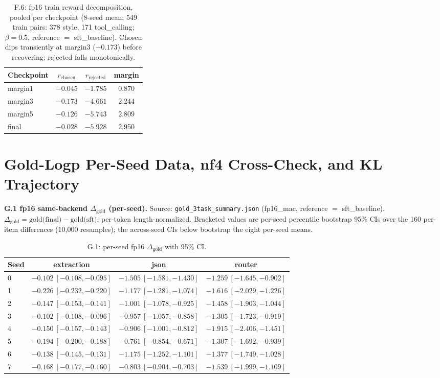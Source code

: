\begin{table}[H]
\centering
\small
\caption{F.6: fp16 train reward decomposition, pooled per checkpoint (8-seed mean; 549 train pairs: 378 style, 171 tool\_calling; $\beta{=}0.5$, reference $=$ sft\_baseline). Chosen dips transiently at margin3 ($-0.173$) before recovering; rejected falls monotonically.}
\label{tab:fp16-train-pooled}
\begin{tabular}{@{}lccc@{}}
\toprule
Checkpoint & $r_{\text{chosen}}$ & $r_{\text{rejected}}$ & margin\\
\midrule
margin1 & $-0.045$ & $-1.785$ & 0.870\\
margin3 & $-0.173$ & $-4.661$ & 2.244\\
margin5 & $-0.126$ & $-5.743$ & 2.809\\
final & $-0.028$ & $-5.928$ & 2.950\\
\bottomrule
\end{tabular}
\end{table}

\section{Gold-Logp Per-Seed Data, nf4 Cross-Check, and KL Trajectory}
\label{app:gold}
\textbf{G.1 fp16 same-backend $\Delta_{\text{gold}}$ (per-seed).} Source: \texttt{gold\_3task\_summary.json} (fp16\_mac, reference $=$ sft\_baseline). $\Delta_{\text{gold}} = \text{gold(final)} - \text{gold(sft)}$, per-token length-normalized. Bracketed values are per-seed percentile bootstrap 95\% CIs over the 160 per-item differences (10{,}000 resamples); the across-seed CIs below bootstrap the eight per-seed means.

\begin{table}[H]
\centering
\small
\caption{G.1: per-seed fp16 $\Delta_{\text{gold}}$ with 95\% CI.}
\begin{tabular}{@{}lccc@{}}
\toprule
Seed & extraction & json & router\\
\midrule
0 & $-0.102\ [-0.108,-0.095]$ & $-1.505\ [-1.581,-1.430]$ & $-1.259\ [-1.645,-0.902]$\\
1 & $-0.226\ [-0.232,-0.220]$ & $-1.177\ [-1.281,-1.074]$ & $-1.616\ [-2.029,-1.226]$\\
2 & $-0.147\ [-0.153,-0.141]$ & $-1.001\ [-1.078,-0.925]$ & $-1.458\ [-1.903,-1.044]$\\
3 & $-0.102\ [-0.108,-0.096]$ & $-0.957\ [-1.057,-0.858]$ & $-1.305\ [-1.723,-0.919]$\\
4 & $-0.150\ [-0.157,-0.143]$ & $-0.906\ [-1.001,-0.812]$ & $-1.915\ [-2.406,-1.451]$\\
5 & $-0.194\ [-0.200,-0.188]$ & $-0.761\ [-0.854,-0.671]$ & $-1.307\ [-1.692,-0.939]$\\
6 & $-0.138\ [-0.145,-0.131]$ & $-1.175\ [-1.252,-1.101]$ & $-1.377\ [-1.749,-1.028]$\\
7 & $-0.168\ [-0.177,-0.160]$ & $-0.803\ [-0.904,-0.703]$ & $-1.539\ [-1.999,-1.109]$\\
\bottomrule
\end{tabular}
\end{table}

